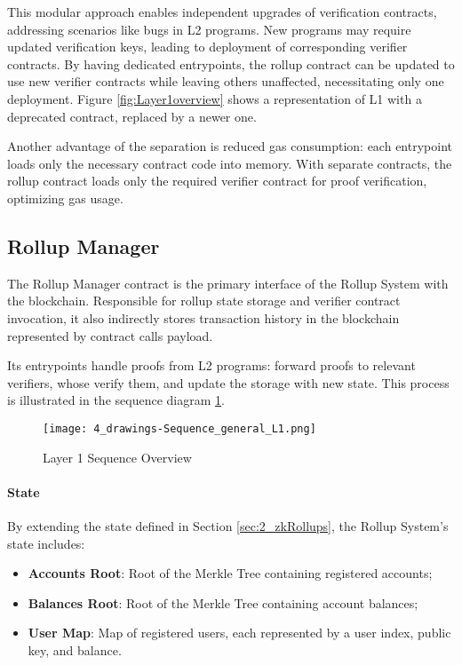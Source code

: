 This modular approach enables independent upgrades of verification contracts, addressing scenarios like bugs in L2 programs. New programs may require updated verification keys, leading to deployment of corresponding verifier contracts. By having dedicated entrypoints, the rollup contract can be updated to use new verifier contracts while leaving others unaffected, necessitating only one deployment. Figure \ref{fig:Layer1overview} shows a representation of L1 with a deprecated contract, replaced by a newer one.

Another advantage of the separation is reduced gas consumption: each entrypoint loads only the necessary contract code into memory. With separate contracts, the rollup contract loads only the required verifier contract for proof verification, optimizing gas usage.

\subsection{Rollup Manager\label{sec:designrollupcontract}}
The Rollup Manager contract is the primary interface of the Rollup System with the blockchain. Responsible for rollup state storage and verifier contract invocation, it also indirectly stores transaction history in the blockchain represented by contract calls payload.

Its entrypoints handle proofs from L2 programs: forward proofs to relevant verifiers, whose verify them, and update the storage with new state. This process is illustrated in the sequence diagram \ref{fig:Layer1sequencediagram}.

\begin{figure}[ht]
  \centering
  \texttt{[image: 4\_drawings-Sequence\_general\_L1.png]}
  \caption{Layer 1 Sequence Overview}
  \label{fig:Layer1sequencediagram}
\end{figure}

\paragraph{State}
By extending the state defined in Section \ref{sec:2_zkRollups}, the Rollup System's state includes:
\begin{itemize}
  \item \textbf{Accounts Root}: Root of the Merkle Tree containing registered accounts;
  \item \textbf{Balances Root}: Root of the Merkle Tree containing account balances;
  \item \textbf{User Map}: Map of registered users, each represented by a user index, public key, and balance.
\end{itemize}

